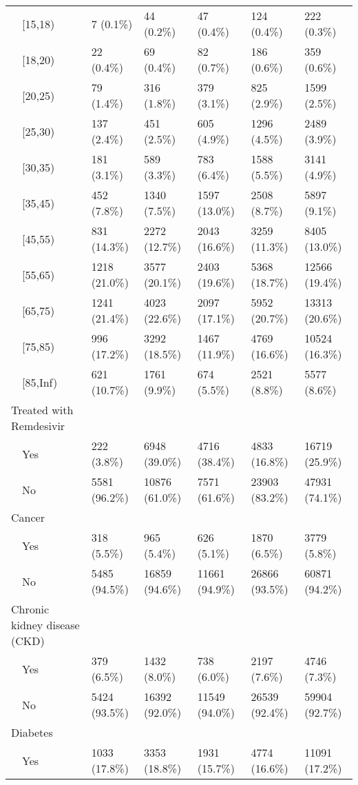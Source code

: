 \begin{table}[ht]
\begin{tabular}{llllll}
    [15,18) & 7 (0.1\%) & 44 (0.2\%) & 47 (0.4\%) & 124 (0.4\%) & 222 (0.3\%) \\ 
    [18,20) & 22 (0.4\%) & 69 (0.4\%) & 82 (0.7\%) & 186 (0.6\%) & 359 (0.6\%) \\ 
    [20,25) & 79 (1.4\%) & 316 (1.8\%) & 379 (3.1\%) & 825 (2.9\%) & 1599 (2.5\%) \\ 
    [25,30) & 137 (2.4\%) & 451 (2.5\%) & 605 (4.9\%) & 1296 (4.5\%) & 2489 (3.9\%) \\ 
    [30,35) & 181 (3.1\%) & 589 (3.3\%) & 783 (6.4\%) & 1588 (5.5\%) & 3141 (4.9\%) \\ 
    [35,45) & 452 (7.8\%) & 1340 (7.5\%) & 1597 (13.0\%) & 2508 (8.7\%) & 5897 (9.1\%) \\ 
    [45,55) & 831 (14.3\%) & 2272 (12.7\%) & 2043 (16.6\%) & 3259 (11.3\%) & 8405 (13.0\%) \\ 
    [55,65) & 1218 (21.0\%) & 3577 (20.1\%) & 2403 (19.6\%) & 5368 (18.7\%) & 12566 (19.4\%) \\ 
    [65,75) & 1241 (21.4\%) & 4023 (22.6\%) & 2097 (17.1\%) & 5952 (20.7\%) & 13313 (20.6\%) \\ 
    [75,85) & 996 (17.2\%) & 3292 (18.5\%) & 1467 (11.9\%) & 4769 (16.6\%) & 10524 (16.3\%) \\ 
    [85,Inf) & 621 (10.7\%) & 1761 (9.9\%) & 674 (5.5\%) & 2521 (8.8\%) & 5577 (8.6\%) \\ 
  Treated with Remdesivir &  &  &  &  &  \\ 
    Yes & 222 (3.8\%) & 6948 (39.0\%) & 4716 (38.4\%) & 4833 (16.8\%) & 16719 (25.9\%) \\ 
    No & 5581 (96.2\%) & 10876 (61.0\%) & 7571 (61.6\%) & 23903 (83.2\%) & 47931 (74.1\%) \\ 
  Cancer &  &  &  &  &  \\ 
    Yes & 318 (5.5\%) & 965 (5.4\%) & 626 (5.1\%) & 1870 (6.5\%) & 3779 (5.8\%) \\ 
    No & 5485 (94.5\%) & 16859 (94.6\%) & 11661 (94.9\%) & 26866 (93.5\%) & 60871 (94.2\%) \\ 
  Chronic kidney disease (CKD) &  &  &  &  &  \\ 
    Yes & 379 (6.5\%) & 1432 (8.0\%) & 738 (6.0\%) & 2197 (7.6\%) & 4746 (7.3\%) \\ 
    No & 5424 (93.5\%) & 16392 (92.0\%) & 11549 (94.0\%) & 26539 (92.4\%) & 59904 (92.7\%) \\ 
  Diabetes &  &  &  &  &  \\ 
    Yes & 1033 (17.8\%) & 3353 (18.8\%) & 1931 (15.7\%) & 4774 (16.6\%) & 11091 (17.2\%) \\ 

\end{tabular}
\end{table}
